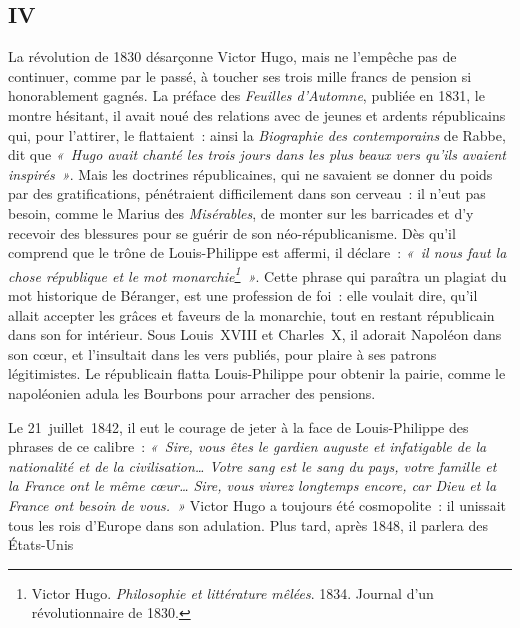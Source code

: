 \documentclass[french,twoside]{book} %
\begin{document}
\subsection[{IV}]{IV}
\noindent La révolution de 1830 désarçonne Victor Hugo, mais ne l’empêche pas de continuer, comme par le passé, à toucher ses trois mille francs de pension si honorablement gagnés. La préface des \emph{Feuilles d’Automne}, publiée en 1831, le montre hésitant, il avait noué des relations avec de jeunes et ardents républicains qui, pour l’attirer, le flattaient : ainsi la \emph{Biographie des contemporains} de Rabbe, dit que \emph{« Hugo avait chanté les trois jours dans les  
\label{p23}plus beaux vers qu’ils avaient inspirés »}. Mais les doctrines républicaines, qui ne savaient se donner du poids par des gratifications, pénétraient difficilement dans son cerveau : il n’eut pas besoin, comme le Marius des \emph{Misérables}, de monter sur les barricades et d’y recevoir des blessures pour se guérir de son néo-républicanisme. Dès qu’il comprend que le trône de Louis-Philippe est affermi, il déclare : \emph{« il nous faut la chose {\itshape république} et le mot {\itshape monarchie}\footnote{Victor Hugo. \emph{Philosophie et littérature mêlées}. 1834. Journal d’un révolutionnaire de 1830.} »}. Cette phrase qui paraîtra un plagiat du mot historique de Béranger, est une profession de foi : elle voulait dire, qu’il allait accepter les grâces et faveurs de la monarchie, tout en restant républicain dans son for intérieur. Sous Louis XVIII et Charles X, il adorait Napoléon dans son cœur, et l’insultait dans les vers publiés, pour plaire à ses patrons légitimistes. Le républicain flatta Louis-Philippe pour obtenir la pairie, comme le napoléonien adula les Bourbons pour arracher des pensions.\par
Le 21 juillet 1842, il eut le courage de jeter à la face de Louis-Philippe des phrases de ce calibre : \emph{« Sire, vous êtes le gardien auguste et infatigable de la nationalité et de la civilisation… Votre sang est le sang du pays, votre famille et la France ont le même cœur… Sire, vous vivrez longtemps encore, car Dieu et la France ont besoin de vous. »} Victor Hugo a toujours été cosmopolite : il unissait tous les rois d’Europe dans son adulation. Plus tard, après 1848, il parlera des États-Unis  
\end{document}
